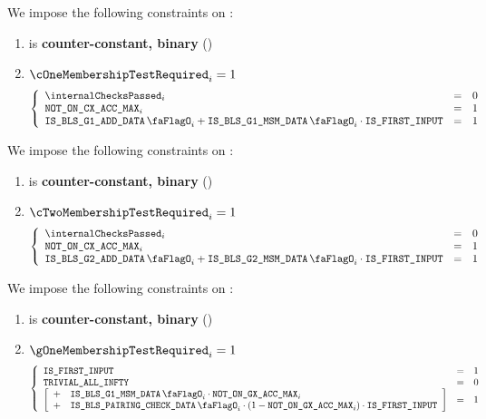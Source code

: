 We impose the following constraints on \cOneMembershipTestRequired{}:
\begin{enumerate}
    \item \cOneMembershipTestRequired{} is \textbf{counter-constant, binary} \quad (\trash)
    \item \If $\cOneMembershipTestRequired_{i} = 1$ \Then
        \[
            \left\{ \begin{array}{lcl}
                \internalChecksPassed _{i} & = & 0 \\
                \notOnCXAccMax_{i}         & = & 1 \\
                \isBlsGOneAddData_{i} + \isBlsGOneMsmData_{i} \cdot \isFirstInput & = & 1 \\
            \end{array} \right.
        \]
\end{enumerate}
\noindent
We impose the following constraints on \cTwoMembershipTestRequired{}:
\begin{enumerate}
    \item \cTwoMembershipTestRequired{} is \textbf{counter-constant, binary} \quad (\trash)
    \item \If $\cTwoMembershipTestRequired_{i} = 1$ \Then
        \[
            \left\{ \begin{array}{lcl}
                \internalChecksPassed _{i} & = & 0 \\
                \notOnCXAccMax_{i}         & = & 1 \\
                \isBlsGTwoAddData_{i} + \isBlsGTwoMsmData_{i} \cdot \isFirstInput & = & 1 \\
            \end{array} \right.
        \]
\end{enumerate}
\noindent
We impose the following constraints on \gOneMembershipTestRequired{}:
\begin{enumerate}
    \item \gOneMembershipTestRequired{} is \textbf{counter-constant, binary} \quad (\trash)
    \item \If $\gOneMembershipTestRequired_{i} = 1$ \Then
        \[
            \left\{ \begin{array}{lcl}
                \isFirstInput & = & 1 \\
                \trivialAllInf & = & 0 \\
                \left[ \begin{array}{cl}
                    + & \isBlsGOneMsmData_{i} \cdot \notOnGXAccMax_{i}  \\
                    + & \isBlsPairingCheckData_{i} \cdot (1 - \notOnGXAccMax_{i}) \cdot \isFirstInput \\
                \end{array} \right] & = & 1 \\
            \end{array} \right.
        \]
\end{enumerate}
